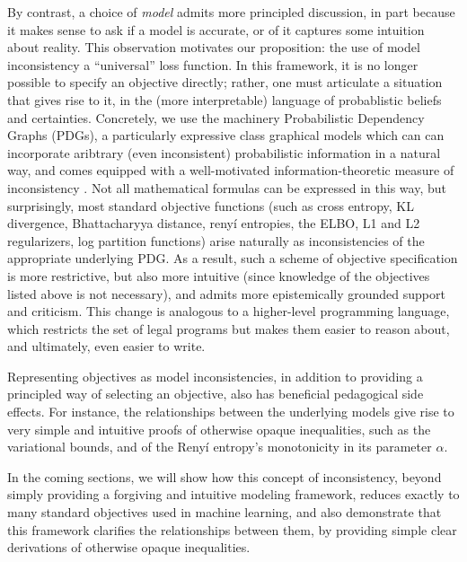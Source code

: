 \documentclass{article}
\theoremstyle{plain}
\theoremstyle{definition}
\begin{document}
By contrast, a choice of \emph{model} admits more principled discussion, in part because it makes sense to ask if a model is accurate, or of it captures some intuition about reality.
This observation motivates our proposition: the use of model inconsistency a ``universal'' loss function. In this framework, it is no longer possible to specify an objective directly; rather, one must articulate a situation that gives rise to it, in the (more interpretable) language of probablistic beliefs and certainties. %
Concretely, we use the machinery Probabilistic Dependency Graphs (PDGs), a particularly expressive class graphical models which can can incorporate aribtrary (even inconsistent) probabilistic information in a natural way, and comes equipped with a well-motivated information-theoretic measure of inconsistency  \cite{richardson2020probabilistic}.
Not all mathematical formulas can be expressed in this way,
but surprisingly, most standard objective functions (such as cross entropy, KL divergence, Bhattacharyya distance, reny\'i entropies, the ELBO, L1 and L2 regularizers, log partition functions) arise naturally as inconsistencies of the appropriate underlying PDG.
As a result, such a scheme of objective specification is more restrictive, but also more intuitive (since knowledge of the objectives listed above is not necessary), and admits more epistemically grounded support and criticism.
This change is analogous to a higher-level programming language, which restricts the set of legal programs but makes them easier to reason about, and ultimately, even easier to write.


Representing objectives as model inconsistencies, in addition to providing a principled way of selecting an objective, also has beneficial pedagogical side effects.  For instance, the relationships between the underlying models give rise to very simple and intuitive proofs of otherwise opaque inequalities, such as the variational bounds, and of the Reny\'i entropy's monotonicity in its parameter $\alpha$.





In the coming sections, we will show how this concept of inconsistency, beyond simply providing a forgiving and intuitive modeling framework, reduces exactly to many standard objectives used in machine learning, and also demonstrate that this framework clarifies the relationships between them, by providing simple clear derivations of otherwise opaque inequalities.
\end{document}
